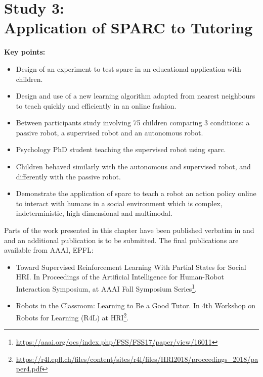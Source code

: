 \chapter[Study 3: Application of SPARC to Tutoring]{Study 3: \\Application of SPARC to Tutoring}\label{chap:tutoring}
\glsresetall
\graphicspath{{images/tutoring/}}

\begin{framed}
	\textbf{Key points:}
	
	\begin{itemize}
		\item Design of an experiment to test \acrshort{sparc} in an educational application with children.
		\item Design and use of a new learning algorithm adapted from nearest neighbours to teach quickly and efficiently in an online fashion.
		\item Between participants study involving 75 children comparing 3 conditions: a passive robot, a supervised robot and an autonomous robot.
		\item Psychology PhD student teaching the supervised robot using \acrshort{sparc}.
		\item Children behaved similarly with the autonomous and supervised robot, and differently with the passive robot.
		\item Demonstrate  the application of \acrshort{sparc} to teach a robot an action policy online to interact with humans in a social environment which is complex, indeterministic, high dimensional and multimodal.
	\end{itemize}
\end{framed}

Parts of the work presented in this chapter have been published verbatim in \cite{senft2017toward} and \cite{senft2018robots} and an additional publication is to be submitted. The final publications are available from AAAI, EPFL:
\begin{itemize}
	\item Toward Supervised
	Reinforcement Learning With Partial States for Social HRI. In Proceedings of the Artificial Intelligence for Human-Robot Interaction Symposium, at AAAI Fall Symposium Series\footnote{\url{https://aaai.org/ocs/index.php/FSS/FSS17/paper/view/16011}}.
	\item Robots in the Classroom: Learning to Be a Good Tutor. In 4th Workshop on Robots for Learning (R4L) at HRI\footnote{\url{https://r4l.epfl.ch/files/content/sites/r4l/files/HRI2018/proceedings_2018/paper4.pdf}}.
\end{itemize} 

